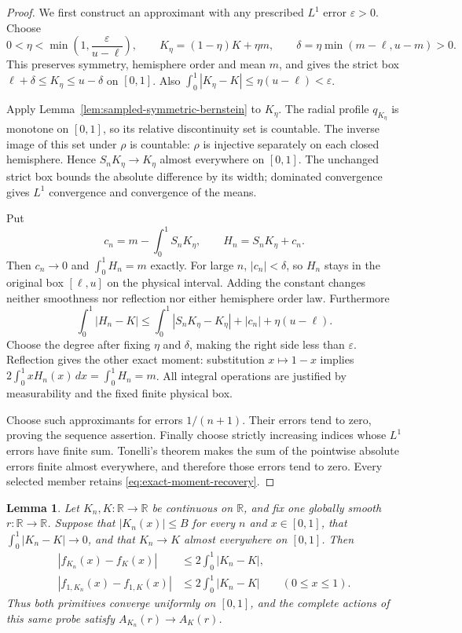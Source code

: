 \documentclass[11pt]{article}
\newtheorem{lemma}[theorem]{Lemma}
\newcommand{\R}{\mathbb R}
\begin{document}
\begin{proof}
We first construct an approximant with any prescribed $L^1$ error
$\varepsilon>0$. Choose
\[
 0<\eta<\min\left(1,\frac{\varepsilon}{u-\ell}\right),\qquad
 K_\eta=(1-\eta)K+\eta m,\qquad
 \delta=\eta\min(m-\ell,u-m)>0.
\]
This preserves symmetry, hemisphere order and mean $m$, and gives the
strict box $\ell+\delta\leq K_\eta\leq u-\delta$ on $[0,1]$.
Also $\int_0^1|K_\eta-K|\leq\eta(u-\ell)<\varepsilon$.

Apply Lemma~\ref{lem:sampled-symmetric-bernstein} to $K_\eta$.
The radial profile $q_{K_\eta}$ is monotone on $[0,1]$, so its relative
discontinuity set is countable. The inverse image of this set under
$\rho$ is countable: $\rho$ is injective separately on each closed
hemisphere. Hence $S_nK_\eta\to K_\eta$ almost everywhere on $[0,1]$.
The unchanged strict box bounds the absolute difference by its width;
dominated convergence gives $L^1$ convergence and convergence of the means.

Put
\[
 c_n=m-\int_0^1S_nK_\eta,\qquad H_n=S_nK_\eta+c_n.
\]
Then $c_n\to0$ and $\int_0^1H_n=m$ exactly.
For large $n$, $|c_n|<\delta$, so $H_n$ stays in the original box
$[\ell,u]$ on the physical interval. Adding the constant changes neither
smoothness nor reflection nor either hemisphere order law.
Furthermore
\[
 \int_0^1|H_n-K|
 \leq\int_0^1|S_nK_\eta-K_\eta|+|c_n|+\eta(u-\ell).
\]
Choose the degree after fixing $\eta$ and $\delta$, making the right side
less than $\varepsilon$. Reflection gives the other exact moment:
substitution $x\mapsto1-x$ implies
$2\int_0^1xH_n(x)\,dx=\int_0^1H_n=m$.
All integral operations are justified by measurability and the fixed
finite physical box.

Choose such approximants for errors $1/(n+1)$. Their errors tend to zero,
proving the sequence assertion. Finally choose strictly increasing indices
whose $L^1$ errors have finite sum. Tonelli's theorem makes the sum of the
pointwise absolute errors finite almost everywhere, and therefore those
errors tend to zero. Every selected member retains \eqref{eq:exact-moment-recovery}.
\end{proof}

\begin{lemma}\label{lem:complete-area-action-convergence}
Let $K_n,K:\R\to\R$ be continuous on $\R$, and fix one globally smooth
$r:\R\to\R$. Suppose that $|K_n(x)|\leq B$ for every $n$ and
$x\in[0,1]$, that $\int_0^1|K_n-K|\to0$, and that $K_n\to K$ almost
everywhere on $[0,1]$. Then
\begin{equation}\label{eq:area-primitive-lone-bounds}
 \begin{aligned}
 |f_{K_n}(x)-f_K(x)|&\leq2\int_0^1|K_n-K|,\\
 |f_{1,K_n}(x)-f_{1,K}(x)|&\leq2\int_0^1|K_n-K|
 \qquad(0\leq x\leq1).
 \end{aligned}
\end{equation}
Thus both primitives converge uniformly on $[0,1]$, and the complete
actions of this same probe satisfy $A_{K_n}(r)\to A_K(r)$.
\end{lemma}
\end{document}
